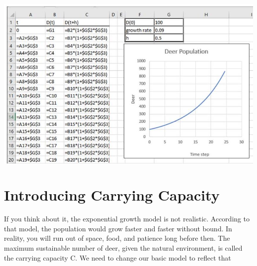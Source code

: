 \documentclass[10pt]{article}
\begin{document}
\includegraphics[max width=\textwidth]{2022_07_05_5945264bba2a5f6ba667g-11}

\section{Introducing Carrying Capacity}
If you think about it, the exponential growth model is not realistic. According to that model, the population would grow faster and faster without bound. In reality, you will run out of space, food, and patience long before then. The maximum sustainable number of deer, given the natural environment, is called the carrying capacity C. We need to change our basic model to reflect that
\end{document}
